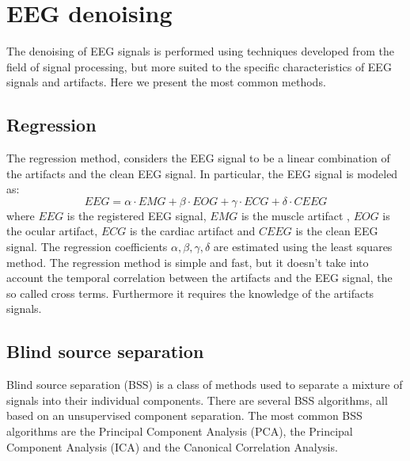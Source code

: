 \documentclass[a4paper]{sapthesis}
\begin{document}
\section{EEG denoising}\label{sec:denoising}
The denoising of EEG signals is performed using techniques developed from
the field of signal processing, but more suited to the specific characteristics
of EEG signals and artifacts. Here we present the most common methods.
\subsection{Regression}\label{sec:regression}
The regression method\cite{regression}, considers the EEG signal to be a
linear combination of the artifacts and the clean EEG signal. In particular,
the EEG signal is modeled as:
\begin{equation}
\label{eq:regression}
EEG = \alpha \cdot EMG + \beta \cdot EOG + \gamma \cdot ECG + \delta \cdot CEEG
\end{equation}
where $EEG$ is the registered EEG signal, $EMG$ is the muscle artifact
, $EOG$ is the ocular artifact,
$ECG$ is the cardiac artifact
and $CEEG$ is the clean EEG signal. \newline
The regression coefficients $\alpha, \beta, \gamma, \delta$ are estimated
using the least squares method. \newline
The regression method is simple and fast, but it doesn't take into account
the temporal correlation between the artifacts and the EEG signal, the so 
called cross terms. Furthermore it requires the knowledge of the artifacts
signals. \newline
\subsection{Blind source separation}\label{sec:bss}
Blind source separation (BSS)\cite{bss} is a  class of methods used to separate a
mixture of signals into their individual components. 
There are several BSS algorithms, all based on an unsupervised component 
separation. 
The most common BSS algorithms are the Principal Component Analysis (PCA),
the Principal Component Analysis (ICA) and the Canonical Correlation Analysis.
\newline
\end{document}
